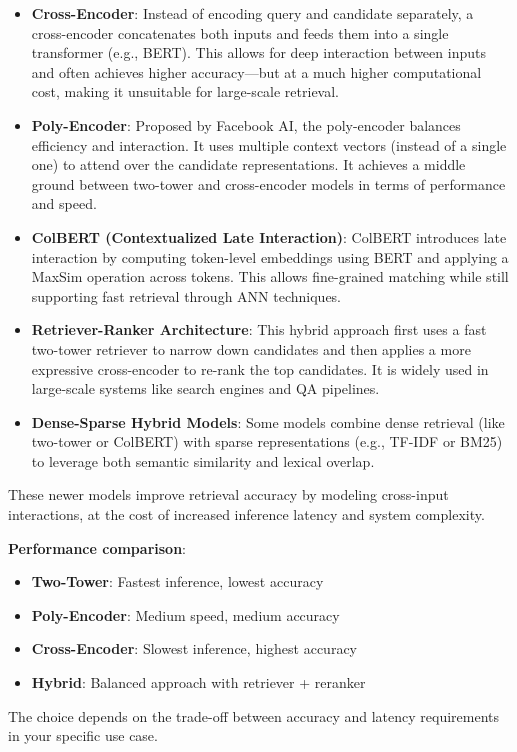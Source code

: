 \begin{itemize}
	\item \textbf{Cross-Encoder}: Instead of encoding query and candidate separately, a cross-encoder concatenates both inputs and feeds them into a single transformer (e.g., BERT). This allows for deep interaction between inputs and often achieves higher accuracy—but at a much higher computational cost, making it unsuitable for large-scale retrieval.

	\item \textbf{Poly-Encoder}: Proposed by Facebook AI, the poly-encoder balances efficiency and interaction. It uses multiple context vectors (instead of a single one) to attend over the candidate representations. It achieves a middle ground between two-tower and cross-encoder models in terms of performance and speed.

	\item \textbf{ColBERT (Contextualized Late Interaction)}: ColBERT introduces late interaction by computing token-level embeddings using BERT and applying a MaxSim operation across tokens. This allows fine-grained matching while still supporting fast retrieval through ANN techniques.

	\item \textbf{Retriever-Ranker Architecture}: This hybrid approach first uses a fast two-tower retriever to narrow down candidates and then applies a more expressive cross-encoder to re-rank the top candidates. It is widely used in large-scale systems like search engines and QA pipelines.

	\item \textbf{Dense-Sparse Hybrid Models}: Some models combine dense retrieval (like two-tower or ColBERT) with sparse representations (e.g., TF-IDF or BM25) to leverage both semantic similarity and lexical overlap.
\end{itemize}

These newer models improve retrieval accuracy by modeling cross-input interactions, at the cost of increased inference latency and system complexity.

\textbf{Performance comparison}:
\begin{itemize}
	\item \textbf{Two-Tower}: Fastest inference, lowest accuracy
	\item \textbf{Poly-Encoder}: Medium speed, medium accuracy
	\item \textbf{Cross-Encoder}: Slowest inference, highest accuracy
	\item \textbf{Hybrid}: Balanced approach with retriever + reranker
\end{itemize}

The choice depends on the trade-off between accuracy and latency requirements in your specific use case.
